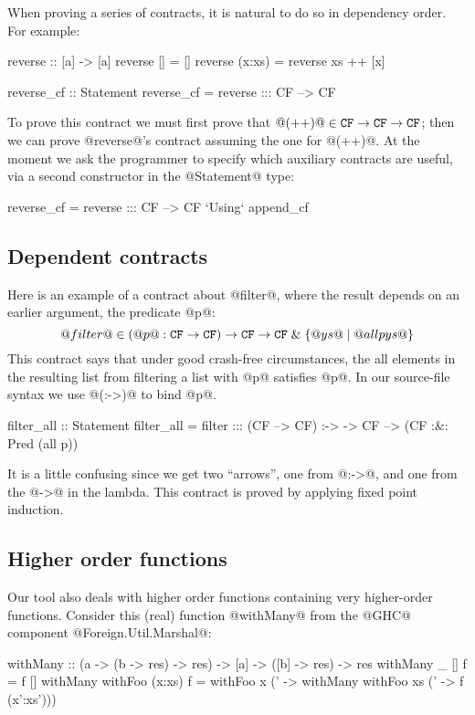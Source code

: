 When proving a series of contracts, it is natural to do so in dependency order.
For example:
\begin{code}
  reverse :: [a] -> [a]
  reverse [] = []
  reverse (x:xs) = reverse xs ++ [x]

  reverse_cf :: Statement
  reverse_cf = reverse ::: CF --> CF
\end{code}
To prove this contract we must first prove that
$@(++)@ \in {\tt CF} \rightarrow {\tt CF} \rightarrow {\tt CF}$;
then we can prove @reverse@'s contract assuming the one for @(++)@.
At the moment we ask the programmer to specify which auxiliary contracts
are useful, via a second constructor in the @Statement@ type:
\begin{code}
  reverse_cf = reverse ::: CF --> CF
                       `Using` append_cf
\end{code}


\subsection{Dependent contracts}

Here is an example of a contract about @filter@,
where the result depends on an earlier argument, the predicate @p@:
$$
@filter@ \in (@p@ : {\tt CF} \rightarrow {\tt CF}) \rightarrow
             {\tt CF} \rightarrow {\tt CF} \;\&\; \{@ys@ \mid @all p ys@ \}
$$
This contract says that under good crash-free circumstances, the
all elements in the resulting list from filtering a list with @p@
satisfies @p@.
In our source-file syntax we use @(:->)@ to bind @p@.
\begin{code}
filter_all :: Statement
filter_all = 
  filter ::: (CF --> CF) :-> \p ->
                CF --> (CF :&: Pred (all p))
\end{code}
It is a little confusing since we get two ``arrows'', one from @:->@,
and one from the @->@ in the lambda.  This contract is proved by
applying fixed point induction.

\subsection{Higher order functions}

Our tool also deals with higher order functions containing
very higher-order functions. Consider this (real) function @withMany@ from the
@GHC@ component @Foreign.Util.Marshal@:

\begin{code}
withMany :: (a -> (b -> res) -> res)
         -> [a] -> ([b] -> res) -> res
withMany _       []     f = f []
withMany withFoo (x:xs) f = withFoo x (\x' ->
      withMany withFoo xs (\xs' -> f (x':xs')))
\end{code}

